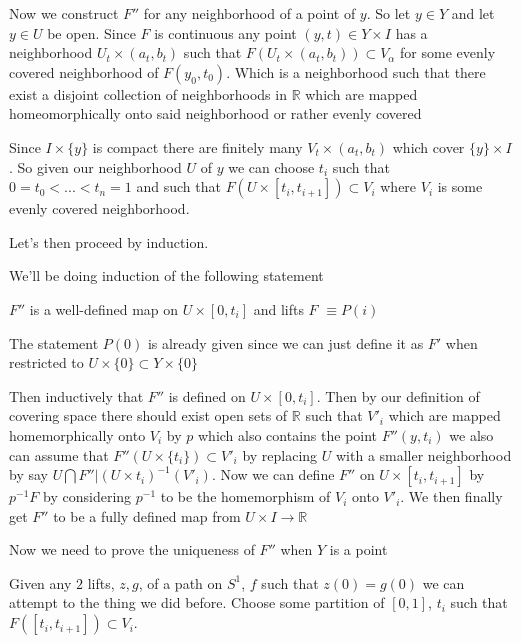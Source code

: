 \documentclass[paper=a4,fontsize=paper,12.5pt]{book}
\newcommand{\3}{\vspace*{3mm}}
\newcommand{\R}{\mathbb{R}}
\newcommand{\C}[1]{{S}^{#1}}
\begin{document}
Now we construct $F''$ for any neighborhood of a point of $y$. So let $y \in Y$ and let $ y \in U$ be open. Since $F$ is continuous any point $(y,t) \in Y \times I$ has a neighborhood ${U}_{t} \times ({a}_{t},{b}_{t})$ such that $F({U}_{t} \times ({a}_{t},{b}_{t})) \subset {V}_{\alpha}$ for some evenly covered neighborhood of $F({y}_{0},{t}_{0})$. Which is a neighborhood such that there exist a disjoint collection of neighborhoods in $\R$ which are mapped homeomorphically onto said neighborhood or rather evenly covered

\3

Since $I \times \{y\}$ is compact there are finitely many ${V}_{t} \times ({a}_{t},{b}_{t})$ which cover $\{y\} \times I$. So given our neighborhood $U$ of $y$ we can choose ${t}_{i}$ such that $0 = {t}_{0} < ... < {t}_{n} = 1$ and such that $F(U \times [{t}_{i},{t}_{i+1}]) \subset {V}_{i}$ where ${V}_{i}$ is some evenly covered neighborhood. 

\3

Let's then proceed by induction. 

\3

We'll be doing induction of the following statement

\3

$F''$ is a well-defined map on $U \times [0,{t}_{i}]$ and lifts $F$  $\equiv P(i)$

\3

The statement $P(0)$ is already given since we can just define it as $F'$ when restricted to $U \times \{0\} \subset Y \times \{0\} $

\3

Then inductively that $F''$ is defined on $U \times [0,{t}_{i}]$. Then by our definition of covering space there should exist open sets of $\R$ such that ${V'}_{i}$ which are mapped homemorphically onto ${V}_{i}$ by $p$ which also contains the point $F''(y,{t}_{i})$ we also can assume that $F''( U \times \{{t}_{i} \}) \subset {V'}_{i}$ by replacing $U$ with a smaller neighborhood by say $U \bigcap {F'' |(U \times {{t}_{i}})}^{-1}({V'}_{i})$. Now we can define $F''$ on $U \times [{t}_{i}, {t}_{i+1}]$ by ${p}^{-1}F$ by considering ${p}^{-1}$ to be the homemorphism of ${V}_{i}$ onto ${V'}_{i}$. We then finally get $F''$ to be a fully defined map from $U \times I \to \R$

\3

Now we need to prove the uniqueness of $F''$ when $Y$ is a point
\3

Given any $2$ lifts, $z,g$, of a path on $\C{1}$, $f$ such that $z(0) = g(0)$ we can attempt to the thing we did before. Choose some partition of $[0,1]$, ${t}_{i}$ such that $F([{t}_{i},{t}_{i+1}]) \subset {V}_{i}$. 
\end{document}
